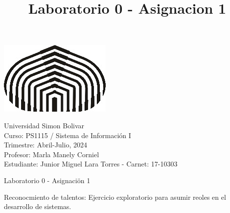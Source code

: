 \documentclass[a4paper,12pt]{article}
\title{Laboratorio 0 - Asignacion 1}
\begin{document}
\begin{center}
\par \includegraphics[scale=1]{USB} \par
Universidad Simon Bolivar \\ Curso: PS1115 / Sistema de Información I \\ Trimestre: Abril-Julio, 2024 \\ Profesor: Marla Manely Corniel \\ Estudiante: Junior Miguel Lara Torres - Carnet: 17-10303 \\
\end{center}

\begin{center}
Laboratorio 0 - Asignaciön 1
\end{center}

Reconocmiento de talentos: Ejercicio exploratorio para asumir reoles en el desarrollo de sistemas.
\end{document}
